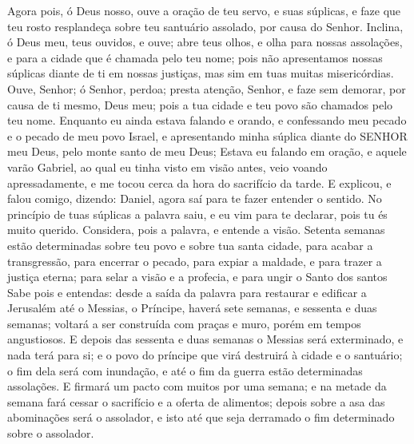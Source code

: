 {Agora pois, ó Deus nosso, ouve a oração de teu servo, e suas súplicas, e faze que teu rosto resplandeça sobre teu santuário assolado, por causa do Senhor.
Inclina, ó Deus meu, teus ouvidos, e ouve; abre teus olhos, e olha para nossas assolações, e para a cidade que é chamada pelo teu nome; pois não apresentamos nossas súplicas diante de ti
{} em nossas justiças, mas sim em tuas muitas misericórdias.
Ouve, Senhor; ó Senhor, perdoa; presta atenção, Senhor, e faze sem demorar, por causa de ti mesmo, Deus meu; pois a tua cidade e teu povo são chamados pelo teu nome.
Enquanto eu ainda estava falando e orando, e confessando meu pecado e o pecado de meu povo Israel, e apresentando minha súplica diante do SENHOR meu Deus, pelo monte santo de meu Deus;
Estava eu falando em oração, e aquele varão Gabriel, ao qual eu tinha visto em visão antes, veio voando apressadamente, e me tocou cerca da hora do sacrifício da tarde.
E
{} explicou, e falou comigo, dizendo: Daniel, agora saí para te fazer entender o sentido.
No princípio de tuas súplicas a palavra saiu, e eu vim para te declarar, pois tu és muito querido. Considera, pois a palavra, e entende a visão.
Setenta semanas estão determinadas sobre teu povo e sobre tua santa cidade, para acabar a transgressão, para encerrar o pecado, para expiar a maldade, e para trazer a justiça eterna; para selar a visão e a profecia, e para ungir o Santo dos santos
Sabe pois e entendas: desde a saída da palavra para restaurar e edificar a Jerusalém até o Messias, o Príncipe, haverá sete semanas, e sessenta e duas semanas; voltará a ser construída com praças e muro, porém em tempos angustiosos.
E depois das sessenta e duas semanas o Messias será exterminado, e nada terá para si; e o povo do príncipe que virá destruirá à cidade e o santuário; o fim dela será com inundação, e até o fim da guerra estão determinadas assolações.
E firmará um pacto com muitos por uma semana; e na metade da semana fará cessar o sacrifício e a oferta de alimentos; depois sobre a asa das abominações será o assolador, e isto até que seja derramado o fim determinado sobre o assolador.

\par }

